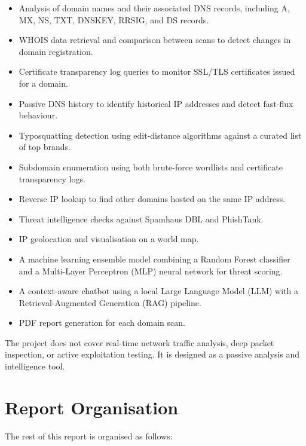 \documentclass[12pt, a4paper, oneside]{report}
\begin{document}
\begin{itemize}
    \item Analysis of domain names and their associated DNS records, including A, MX, NS, TXT, DNSKEY, RRSIG, and DS records.
    \item WHOIS data retrieval and comparison between scans to detect changes in domain registration.
    \item Certificate transparency log queries to monitor SSL/TLS certificates issued for a domain.
    \item Passive DNS history to identify historical IP addresses and detect fast-flux behaviour.
    \item Typosquatting detection using edit-distance algorithms against a curated list of top brands.
    \item Subdomain enumeration using both brute-force wordlists and certificate transparency logs.
    \item Reverse IP lookup to find other domains hosted on the same IP address.
    \item Threat intelligence checks against Spamhaus DBL and PhishTank.
    \item IP geolocation and visualisation on a world map.
    \item A machine learning ensemble model combining a Random Forest classifier and a Multi-Layer Perceptron (MLP) neural network for threat scoring.
    \item A context-aware chatbot using a local Large Language Model (LLM) with a Retrieval-Augmented Generation (RAG) pipeline.
    \item PDF report generation for each domain scan.
\end{itemize}

The project does not cover real-time network traffic analysis, deep packet inspection, or active exploitation testing. It is designed as a passive analysis and intelligence tool.

\section{Report Organisation}

The rest of this report is organised as follows:
\end{document}
